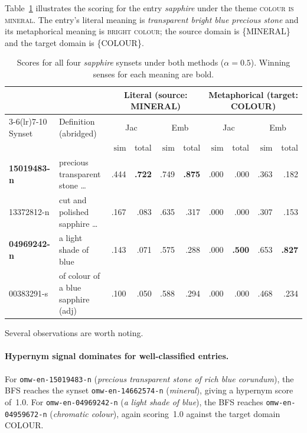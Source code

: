 \documentclass[11pt,a4paper]{article}
\begin{document}
Table~\ref{tab:sapphire} illustrates the scoring for the entry
\emph{sapphire} under the theme \textsc{colour is mineral}.
The entry's literal meaning is \emph{transparent bright blue precious stone}
and its metaphorical meaning is \textsc{bright colour}; the source domain
is \{MINERAL\} and the target domain is \{COLOUR\}.

\begin{table}[ht]
\centering
\caption{Scores for all four \emph{sapphire} synsets under both methods
         ($\alpha=0.5$). Winning senses for each meaning are bold.}
\label{tab:sapphire}
\small
\begin{tabular}{llrrrr|rrrr}
\toprule
& & \multicolumn{4}{c|}{Literal (source: MINERAL)}
  & \multicolumn{4}{c}{Metaphorical (target: COLOUR)} \\
\cmidrule(lr){3-6}\cmidrule(lr){7-10}
Synset & Definition (abridged) & \multicolumn{2}{c}{Jac} & \multicolumn{2}{c|}{Emb}
                               & \multicolumn{2}{c}{Jac} & \multicolumn{2}{c}{Emb} \\
& & $\mathrm{sim}$ & total & $\mathrm{sim}$ & total
  & $\mathrm{sim}$ & total & $\mathrm{sim}$ & total \\
\midrule
\textbf{15019483-n} & precious transparent stone \ldots  & .444 & \textbf{.722} & .749 & \textbf{.875} & .000 & .000 & .363 & .182 \\
13372812-n & cut and polished sapphire \ldots           & .167 & .083           & .635 & .317           & .000 & .000 & .307 & .153 \\
\textbf{04969242-n} & a light shade of blue               & .143 & .071           & .575 & .288           & .000 & \textbf{.500} & .653 & \textbf{.827} \\
00383291-s & of colour of a blue sapphire (adj)          & .100 & .050           & .588 & .294           & .000 & .000 & .468 & .234 \\
\bottomrule
\end{tabular}
\end{table}

Several observations are worth noting.

\paragraph{Hypernym signal dominates for well-classified entries.}
For \texttt{omw-en-15019483-n} (\emph{precious transparent stone of rich
blue corundum}), the BFS reaches the synset \texttt{omw-en-14662574-n}
(\emph{mineral}), giving a hypernym score of~1.0.
For \texttt{omw-en-04969242-n} (\emph{a light shade of blue}), the BFS
reaches \texttt{omw-en-04959672-n} (\emph{chromatic colour}), again
scoring~1.0 against the target domain COLOUR.
\end{document}
